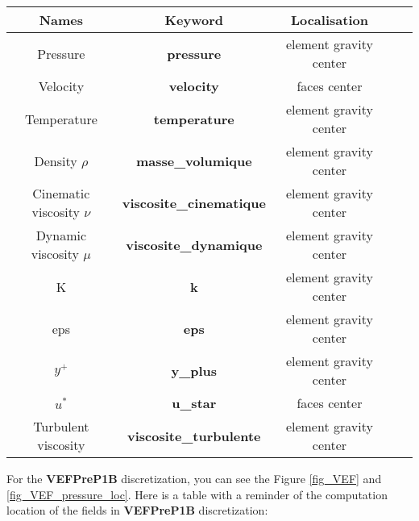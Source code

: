 \begin{longtable}[h!]{|c|c|c|c|c|}
\hline 
\textbf{Names}              & \textbf{Keyword}                  & \textbf{Localisation}     \\ \hline
\hline
Pressure                    & \textbf{pressure}                 & element gravity center    \\ \hline
Velocity                    & \textbf{velocity}                 & faces center              \\ \hline
Temperature                 & \textbf{temperature}              & element gravity center    \\ \hline
\hline
Density $\rho$              & \textbf{masse\_volumique}         & element gravity center    \\ \hline
Cinematic viscosity $\nu$   & \textbf{viscosite\_cinematique}   & element gravity center    \\ \hline
Dynamic viscosity $\mu$     & \textbf{viscosite\_dynamique}     & element gravity center    \\ \hline
\hline
K                           & \textbf{k}                        & element gravity center    \\ \hline
eps                         & \textbf{eps}                      & element gravity center    \\ \hline
$y^+$                       & \textbf{y\_plus}                  & element gravity center    \\ \hline
$u^*$                       & \textbf{u\_star}                  & faces center              \\ \hline
Turbulent viscosity         & \textbf{viscosite\_turbulente}    & element gravity center    \\ \hline
\end{longtable}


For the \textbf{VEFPreP1B} discretization, you can see the Figure \ref{fig_VEF} and \ref{fig_VEF_pressure_loc}. Here is a table with a reminder of the computation location of the fields in \textbf{VEFPreP1B} discretization:

